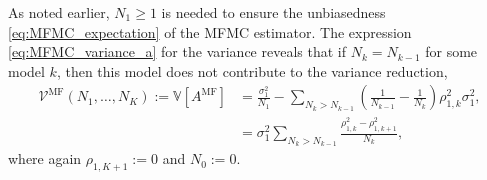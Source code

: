 As noted earlier,  $N_1 \ge 1$ is needed to ensure the unbiasedness \eqref{eq:MFMC_expectation}
of the MFMC estimator.
The expression  \eqref{eq:MFMC_variance_a} for the variance reveals that if
$N_k = N_{k-1}$ for some model $k$, then this model does not contribute to the variance reduction,
\begin{subequations}  \label{eq:MFMC_variance_k}
\begin{align}
    \mathcal{V}^{\text{MF}}(N_1, \ldots, N_K)
    :=  \mathbb{V}[A^{\text{MF}}]
   & = \frac{\sigma_1^2}{N_1} 
       - \sum_{N_k > N_{k-1}} \left(\frac{1}{N_{k-1}} - \frac{1}{N_k}\right) \rho_{1,k}^2 \sigma_1^2,   \label{eq:MFMC_variance_k_a} \\
   &= \sigma_1^2\sum_{N_k > N_{k-1}} \frac{ \rho_{1,k}^2 - \rho_{1,k+1}^2}{N_k},           \label{eq:MFMC_variance_k_b}
\end{align}
\end{subequations}
where again $\rho_{1,K+1} :=0$ and $N_0 := 0$.
